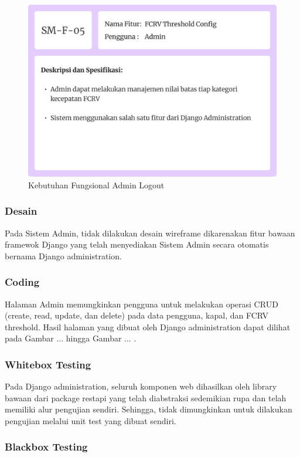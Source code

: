 \begin{figure}[!h]
    \includegraphics[width=.8\linewidth, center]{images/hasil/iterations/3/fr-fcrv.png}
    \caption{Kebutuhan Fungsional Admin Logout}
    \label{fig:fr-logout-admin}
\end{figure}

\newpage

\subsubsection{Desain}

Pada Sistem Admin, tidak dilakukan desain wireframe dikarenakan fitur bawaan framewok Django yang telah menyediakan Sistem Admin secara otomatis bernama Django administration.

\subsubsection{Coding}

Halaman Admin memungkinkan pengguna untuk melakukan operasi CRUD (create, read, update, dan delete) pada data pengguna, kapal, dan FCRV threshold. Hasil halaman yang dibuat oleh Django administration dapat dilihat pada Gambar ... hingga Gambar ... .

\subsubsection{Whitebox Testing}

Pada Django administration, seluruh komponen web dihasilkan oleh library bawaan dari package restapi yang telah diabstraksi sedemikian rupa dan telah memiliki alur pengujian sendiri. Sehingga, tidak dimungkinkan untuk dilakukan pengujian melalui unit test yang dibuat sendiri.

\begin{landscape}
    \subsubsection{Blackbox Testing}

    
    \newpage
    
    \newpage
    
\end{landscape}

